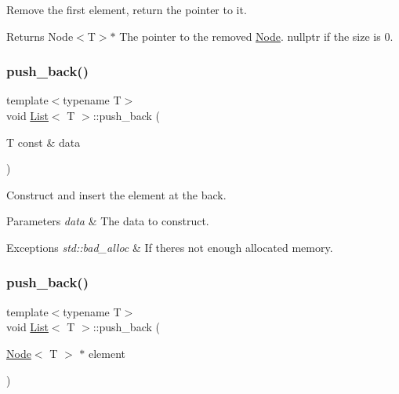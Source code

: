 Remove the first element, return the pointer to it. 

\begin{DoxyReturn}{Returns}
Node$<$\+T$>$$\ast$ The pointer to the removed \hyperlink{structNode}{Node}. {\ttfamily nullptr} if the size is 0. 
\end{DoxyReturn}
\mbox{\label{classList_afc370c46b52217d24992076d66e78c2e}} 
\subsubsection{\texorpdfstring{push\+\_\+back()}{push\_back()}\hspace{0.1cm}{\footnotesize\ttfamily [1/2]}}
{\footnotesize\ttfamily template$<$typename T$>$ \\
void \hyperlink{classList}{List}$<$ T $>$\+::push\+\_\+back (\begin{DoxyParamCaption}\item[{T const \&}]{data }\end{DoxyParamCaption})\hspace{0.3cm}{\ttfamily [inline]}}



Construct and insert the element at the back. 


\begin{DoxyParams}{Parameters}
{\em data} & The data to construct.\\
\hline
\end{DoxyParams}

\begin{DoxyExceptions}{Exceptions}
{\em std\+::bad\+\_\+alloc} & If there\textquotesingle{}s not enough allocated memory. \\
\hline
\end{DoxyExceptions}
\mbox{\label{classList_a36d7022ab9a7fadeb45a5933e64e8bd8}} 
\subsubsection{\texorpdfstring{push\+\_\+back()}{push\_back()}\hspace{0.1cm}{\footnotesize\ttfamily [2/2]}}
{\footnotesize\ttfamily template$<$typename T$>$ \\
void \hyperlink{classList}{List}$<$ T $>$\+::push\+\_\+back (\begin{DoxyParamCaption}\item[{\hyperlink{structNode}{Node}$<$ T $>$ $\ast$}]{element }\end{DoxyParamCaption})\hspace{0.3cm}{\ttfamily [inline]}}



